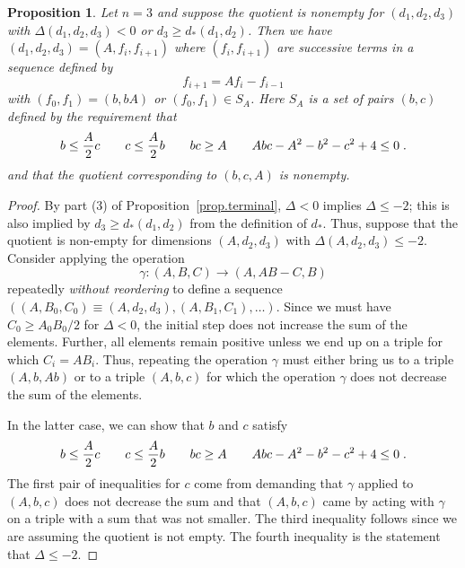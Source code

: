 \documentclass[12pt]{article}
\newtheorem{proposition}[theorem]{Proposition}
\theoremstyle{definition}
\newcommand{\be}{\begin{equation}}
\newcommand{\ee}{\end{equation}}
\begin{document}
\begin{proposition}\label{prop.Fib}
Let $n=3$ and suppose the quotient is nonempty for $(d_1,d_2,d_3)$ with $\Delta(d_1,d_2,d_3) < 0$ or $d_3 \ge d_*(d_1,d_2)$. Then we have $(d_1,d_2,d_3) = (A, f_i, f_{i+1})$ where $(f_i,f_{i+1})$ are successive terms in a sequence defined by
\be
\label{Fib}
f_{i+1} = A f_i - f_{i-1}
\ee
with $(f_0,f_1) = (b,bA)$ or $(f_0,f_1)\in S_A$. Here $S_A$ is a set of pairs $(b,c)$ defined by the requirement that
\be
\label{Sregion}
 b \le  {A \over 2} c \qquad  c \le {A \over 2} b  \qquad bc \ge A \qquad Abc - A^2 - b^2 - c^2 + 4 \le 0  \; .
\ee
and that the quotient corresponding to $(b,c,A)$ is nonempty.
\end{proposition}
\begin{proof}
By part (3) of Proposition~\ref{prop.terminal}, $\Delta < 0$ implies $\Delta \le -2$; this is also implied by $d_3 \ge d_*(d_1,d_2)$ from the definition of $d_*$. Thus, suppose that the quotient is non-empty for dimensions $(A,d_2,d_3)$ with $\Delta(A,d_2,d_3) \le -2$. Consider applying the operation
\be
\gamma: (A,B,C) \to (A, A B - C, B)
\ee
repeatedly {\it without reordering} to define a sequence $((A,B_0,C_0) \equiv (A,d_2,d_3),(A,B_1,C_1), \dots)$. Since we must have $C_0 \ge A_0 B_0/2$ for $\Delta < 0$, the initial step does not increase the sum of the elements. Further, all elements remain positive unless we end up on a triple for which $C_i = A B_i$. Thus, repeating the operation $\gamma$ must either bring us to a triple $(A,b,Ab)$ or to a triple $(A,b,c)$ for which the operation $\gamma$ does not decrease the sum of the elements.

In the latter case, we can show that $b$ and $c$ satisfy
\be
 b \le  {A \over 2} c \qquad  c \le {A \over 2} b \qquad bc \ge A \qquad Abc - A^2 - b^2 - c^2 + 4 \le 0  \; .
\ee
The first pair of inequalities for $c$ come from demanding that $\gamma$ applied to $(A,b,c)$ does not decrease the sum and that $(A,b,c)$ came by acting with $\gamma$ on a triple with a sum that was not smaller. The third inequality follows since we are assuming the quotient is not empty. The fourth inequality is the statement that $\Delta \le -2$.


\end{proof}
\end{document}
